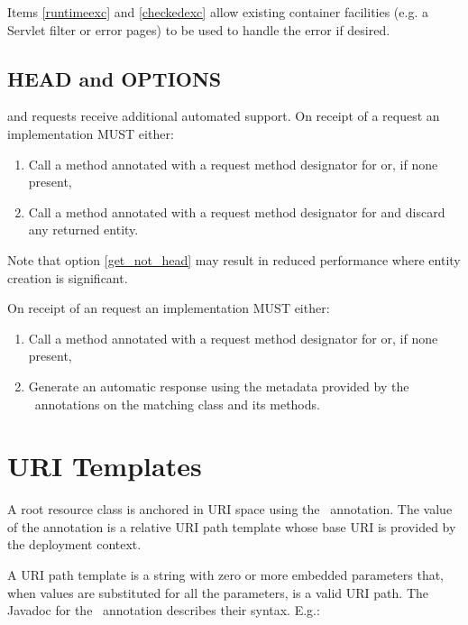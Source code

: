 \begin{nnnote}Items \ref{runtimeexc} and \ref{checkedexc} allow existing container facilities (e.g. a Servlet filter or error pages) to be used to handle the error if desired.\end{nnnote}

\subsection{HEAD and OPTIONS}
\label{head_and_options}

 and  requests receive additional automated support. On receipt of a  request an implementation MUST either:

\begin{enumerate}
\item Call a method annotated with a request method designator for  or, if none present,
\item\label{get_not_head} Call a method annotated with a request method designator for  and discard any returned entity.
\end{enumerate}

Note that option \ref{get_not_head} may result in reduced performance where entity creation is significant.

On receipt of an  request an implementation MUST either:

\begin{enumerate}
\item Call a method annotated with a request method designator for  or, if none present,
\item Generate an automatic response using the metadata provided by the \jaxrs\ annotations on the matching class and its methods.
\end{enumerate}

\section{URI Templates}

A root resource class is anchored in URI space using the \Path\ annotation. The value of the annotation is a relative URI path template whose base URI is provided by the deployment context.

A URI path template is a string with zero or more embedded parameters that, when values are substituted for all the parameters, is a valid URI\cite{uri} path. The Javadoc for the \Path\ annotation describes their syntax. E.g.:


